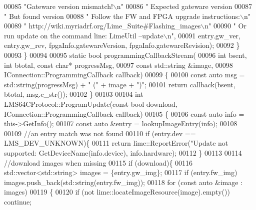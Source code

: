 \begin{DoxyCode}
{00085             \textcolor{stringliteral}{"Gateware version mismatch!\(\backslash\)n"}
00086             \textcolor{stringliteral}{"  Expected gateware version %
00087             \textcolor{stringliteral}{"  But found version %
00088             \textcolor{stringliteral}{"  Follow the FW and FPGA upgrade instructions:\(\backslash\)n"}
00089             \textcolor{stringliteral}{"  http://wiki.myriadrf.org/Lime\_Suite#Flashing\_images\(\backslash\)n"}
00090             \textcolor{stringliteral}{"  Or run update on the command line: LimeUtil --update\(\backslash\)n"},
00091             entry.gw\_ver, entry.gw\_rev, fpgaInfo.gatewareVersion, fpgaInfo.gatewareRevision);
00092     \}
00093 \}
00094 
00095 \textcolor{keyword}{static} \textcolor{keywordtype}{bool} programmingCallbackStream(
00096     \textcolor{keywordtype}{int} bsent, \textcolor{keywordtype}{int} btotal, \textcolor{keyword}{const} \textcolor{keywordtype}{char}* progressMsg,
00097     \textcolor{keyword}{const} std::string &image,
00098     IConnection::ProgrammingCallback callback)
00099 \{
00100     \textcolor{keyword}{const} \textcolor{keyword}{auto} msg = std::string(progressMsg) + \textcolor{stringliteral}{" ("} + image + \textcolor{stringliteral}{")"};
00101     \textcolor{keywordflow}{return} callback(bsent, btotal, msg.c\_str());
00102 \}
00103 
00104 \textcolor{keywordtype}{int} LMS64CProtocol::ProgramUpdate(\textcolor{keyword}{const} \textcolor{keywordtype}{bool} download, 
      IConnection::ProgrammingCallback callback)
00105 \{
00106     \textcolor{keyword}{const} \textcolor{keyword}{auto} info = this->GetInfo();
00107     \textcolor{keyword}{const} \textcolor{keyword}{auto} &entry = lookupImageEntry(info);
00108 
00109     \textcolor{comment}{//an entry match was not found}
00110     \textcolor{keywordflow}{if} (entry.dev == LMS_DEV_UNKNOWN)\{
00111         \textcolor{keywordflow}{return} lime::ReportError(\textcolor{stringliteral}{"Update not supported: %
      GetDeviceName(info.device), info.hardware);
00112     \}
00113 
00114     \textcolor{comment}{//download images when missing}
00115     \textcolor{keywordflow}{if} (download)\{
00116         std::vector<std::string> images = \{entry.gw\_img\};
00117         \textcolor{keywordflow}{if} (entry.fw\_img) images.push\_back(std::string(entry.fw\_img));
00118         \textcolor{keywordflow}{for} (\textcolor{keyword}{const} \textcolor{keyword}{auto} &image : images)
00119         \{
00120             \textcolor{keywordflow}{if} (not lime::locateImageResource(image).empty()) \textcolor{keywordflow}{continue};
}}}}
\end{DoxyCode}
